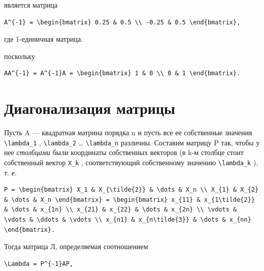 \documentclass[
  ukrainian,
]{article}
\begin{document}
является матрица

\begin{verbatim}
A^{-1} = \begin{bmatrix} 0.25 & 0.5 \\ -0.25 & 0.5 \end{bmatrix},
\end{verbatim}

где 1-единичная матрица.

поскольку

\begin{verbatim}
AA^{-1} = A^{-1}A = \begin{bmatrix} 1 & 0 \\ 0 & 1 \end{bmatrix}.
\end{verbatim}

\section{Диагонализация
матрицы}\label{ux434ux438ux430ux433ux43eux43dux430ux43bux438ux437ux430ux446ux438ux44f-ux43cux430ux442ux440ux438ux446ux44b}

Пусть A --- квадратная матрина порядка n и пусть все ее собственные
значения \texttt{\textbackslash{}lambda\_1} ,
\texttt{\textbackslash{}lambda\_2} \ldots{}
\texttt{\textbackslash{}lambda\_n} различны. Составим матрицу P так,
чтобы у нее \emph{столбцами} были координаты собственных векторов (в k-м
столбце стоит собственный вектор \texttt{X\_k} , соответствующий
собственному значению \texttt{\textbackslash{}lambda\_k} ), т. е.

\begin{verbatim}
P = \begin{bmatrix} X_1 & X_{\tilde{2}} & \dots & X_n \\ X_{1} & X_{2} & \dots & X_n \end{bmatrix} = \begin{bmatrix} x_{11} & x_{1\tilde{2}} & \dots & x_{1n} \\ x_{21} & x_{22} & \dots & x_{2n} \\ \vdots & \vdots & \ddots & \vdots \\ x_{n1} & x_{n\tilde{3}} & \dots & x_{nn} \end{bmatrix}.
\end{verbatim}

Тогда матрица Л, определяемая соотношением

\begin{verbatim}
\Lambda = P^{-1}AP,
\end{verbatim}
\end{document}
